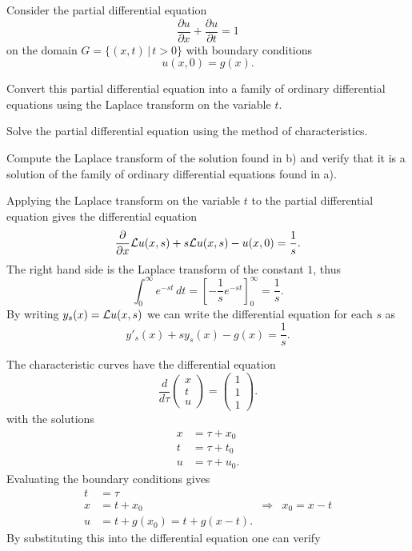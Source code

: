 Consider the partial differential equation
\[
\frac{\partial u}{\partial x}+\frac{\partial u}{\partial t}=1
\]
on the domain $G=\{ (x,t)\,|\,t>0\}$ with boundary conditions
\[
u(x,0)=g(x).
\]
\begin{teilaufgaben}
\item
Convert this partial differential equation into a family of ordinary
differential equations using the Laplace transform on the variable $t$.
\item
Solve the partial differential equation using the method of characteristics.
\item 
Compute the Laplace transform of the solution found in b) and verify
that it is a solution of the family of ordinary differential equations
found in a).
\end{teilaufgaben}

\begin{loesung}
\begin{teilaufgaben}
\item
Applying the Laplace transform on the variable $t$ to the partial
differential equation gives the differential equation
\[
\frac{\partial}{\partial x}{\cal L}u(x,s)
+s{\cal L}u(x,s)-u(x,0)=\frac1s.
\]
The right hand side is the Laplace transform of the constant $1$, thus
\[
\int_0^\infty e^{-st}\,dt
=
\left[
-\frac1s e^{-st}
\right]_0^\infty=\frac1s.
\]
By writing $y_s(x)={\cal L}u(x,s)$ we can write the differential equation
for each $s$ as
\[
y'_s(x)+sy_s(x)-g(x)=\frac1s.
\]
\item
The characteristic curves have the differential equation
\[
\frac{d}{d\tau}\begin{pmatrix}
x\\t\\u
\end{pmatrix}
=\begin{pmatrix}
1\\1\\1
\end{pmatrix}.
\]
with the solutions
\begin{align*}
x&=\tau + x_0\\
t&=\tau + t_0\\
u&=\tau + u_0.
\end{align*}
Evaluating the boundary conditions gives
\begin{align*}
t&=\tau\\
x&=t+x_0
&\Rightarrow&x_0=x-t\\
u&=t+g(x_0)=t+g(x-t).
\end{align*}
By substituting this into the differential equation one can verify

\end{teilaufgaben}
\end{loesung}
